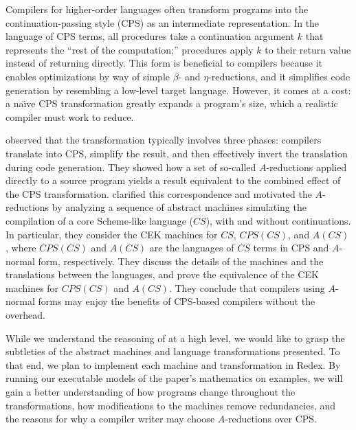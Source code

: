 \documentclass[11pt]{article}
\begin{document}
\thispagestyle{fancy}

Compilers for higher-order languages often transform programs into the
continuation-passing style (CPS) as an intermediate representation. In the
language of CPS terms, all procedures take a continuation argument $k$
that represents the ``rest of the computation;'' procedures apply $k$ to their
return value instead of returning directly. This form is beneficial to
compilers because it enables optimizations by way of simple $\beta$- and
$\eta$-reductions, and it simplifies code generation by resembling a low-level
target language. However, it comes at a cost: a na\"{\i}ve CPS transformation
greatly expands a program's size, which a realistic compiler must work to
reduce.

\citet{Sabry:1992zr} observed that the transformation typically involves
three phases: compilers translate into CPS, simplify the result, and then
effectively invert the translation during code generation. They showed how
a set of so-called $A$-reductions applied directly to a source program yields a
result equivalent to the combined effect of the CPS transformation.
\citet{Flanagan:1993fk} clarified this correspondence and motivated the
$A$-reductions by analyzing a sequence of abstract machines simulating the
compilation of a core Scheme-like language ($\mathit{CS}$), with and without
continuations. In particular, they consider the CEK machines for $\mathit{CS}$,
$\mathit{CPS}(\mathit{CS})$, and $A(\mathit{CS})$, where
$\mathit{CPS}(\mathit{CS})$ and $A(\mathit{CS})$ are the languages of
$\mathit{CS}$ terms in CPS and $A$-normal form, respectively.
They discuss the details of the machines and the translations between the
languages, and prove the equivalence of the CEK machines for
$\mathit{CPS}(\mathit{CS})$ and $A(\mathit{CS})$. They conclude that compilers
using $A$-normal forms may enjoy the benefits of CPS-based compilers without
the overhead.


While we understand the reasoning of \citet{Flanagan:1993fk} at a high level, we
would like to grasp the subtleties of the abstract machines and
language transformations presented. To that end, we plan to implement each
machine and transformation in Redex. By running our executable models of the
paper's mathematics on examples, we will gain a better understanding
of how programs change throughout the transformations, how modifications
to the machines remove redundancies, and the reasons for why a compiler
writer may choose $A$-reductions over CPS.
\end{document}
